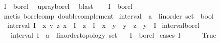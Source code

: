\begin{isabellebody}
\ {\isachardoublequoteopen}{\isacharparenleft}{\kern0pt}{\isacharminus}{\kern0pt}I{\isacharparenright}{\kern0pt}\ {\isasymin}\ borel{\isachardoublequoteclose}\ \isamarkupfalse%
\ up{\isacharunderscore}{\kern0pt}ray{\isacharunderscore}{\kern0pt}borel\ \isamarkupfalse%
\ blast\isanewline
\ \ \isamarkupfalse%
\ {\isachardoublequoteopen}I\ {\isasymin}\ borel{\isachardoublequoteclose}\ \isanewline
\ \ \ \ \isamarkupfalse%
\ {\isacharparenleft}{\kern0pt}metis\ borel{\isacharunderscore}{\kern0pt}comp\ double{\isacharunderscore}{\kern0pt}complement{\isacharparenright}{\kern0pt}\isanewline
{}\isamarkupfalse%
%
\endisatagproof
{\isafoldproof}%
%
\isadelimproof
\isanewline
%
\endisadelimproof
\isanewline
{}\isamarkupfalse%
\ interval\ {\isacharcolon}{\kern0pt}{\isacharcolon}{\kern0pt}\ {\isachardoublequoteopen}{\isacharparenleft}{\kern0pt}{\isacharprime}{\kern0pt}a\ {\isacharcolon}{\kern0pt}{\isacharcolon}{\kern0pt}\ linorder{\isacharparenright}{\kern0pt}\ set\ {\isasymRightarrow}\ bool{\isachardoublequoteclose}\ \isanewline
\ \ {\isachardoublequoteopen}interval\ I\ {\isacharequal}{\kern0pt}\ {\isacharparenleft}{\kern0pt}{\isasymforall}x\ y\ z{\isachardot}{\kern0pt}\ x\ {\isasymin}\ I\ {\isasymlongrightarrow}\ z\ {\isasymin}\ I\ {\isasymlongrightarrow}\ x\ {\isasymle}\ y\ {\isasymlongrightarrow}\ y\ {\isasymle}\ z\ {\isasymlongrightarrow}\ y\ {\isasymin}\ I{\isacharparenright}{\kern0pt}{\isachardoublequoteclose}\isanewline
\isanewline
{}\isamarkupfalse%
\ interval{\isacharunderscore}{\kern0pt}borel{\isacharcolon}{\kern0pt}\isanewline
\ \ \ {\isachardoublequoteopen}interval\ {\isacharparenleft}{\kern0pt}I\ {\isacharcolon}{\kern0pt}{\isacharcolon}{\kern0pt}\ {\isacharparenleft}{\kern0pt}{\isacharparenleft}{\kern0pt}{\isacharprime}{\kern0pt}a\ {\isacharcolon}{\kern0pt}{\isacharcolon}{\kern0pt}\ linorder{\isacharunderscore}{\kern0pt}topology{\isacharparenright}{\kern0pt}\ set{\isacharparenright}{\kern0pt}{\isacharparenright}{\kern0pt}{\isachardoublequoteclose}\isanewline
\ \ \ {\isachardoublequoteopen}I\ {\isasymin}\ borel{\isachardoublequoteclose}\isanewline
%
\isadelimproof
%
\endisadelimproof
%
\isatagproof
{}\isamarkupfalse%
\ {\isacharparenleft}{\kern0pt}cases\ {\isachardoublequoteopen}I\ {\isacharequal}{\kern0pt}\ {\isacharbraceleft}{\kern0pt}{\isacharbraceright}{\kern0pt}{\isachardoublequoteclose}{\isacharparenright}{\kern0pt}\isanewline
\ \ \isamarkupfalse%
\ True\isanewline

\end{isabellebody}
